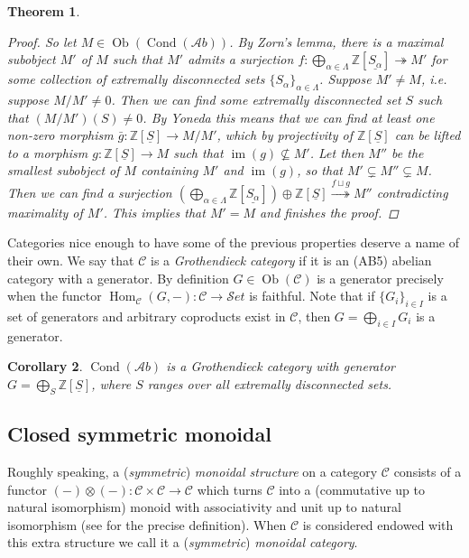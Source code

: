 \documentclass[11pt,A4]{article}
\theoremstyle{plain}
\newtheorem{thm}{Theorem}[section]
\newtheorem{cor}[thm]{Corollary}
\theoremstyle{definition}
\theoremstyle{remark}
\newcommand{\Z}{\mathbb{Z}}
\newcommand{\1}{\mathbbm{1}}
\newcommand{\C}{\mathscr{C}}
\newcommand{\Ab}{\mathscr{A}b}
\newcommand{\Set}{\mathscr{S}et}
\DeclareMathOperator{\Hom}{Hom}
\DeclareMathOperator{\Cond}{Cond}
\DeclareMathOperator{\Ob}{Ob}
\DeclareMathOperator{\im}{im}
\renewcommand{\u}[1]{\underline{#1}}
\newcommand{\ot}{\otimes}
\newcommand{\op}{\oplus}
\begin{document}
\begin{thm}
\begin{proof}
	So let $M\in \Ob(\Cond(\Ab))$.
	By Zorn's lemma, there is a maximal subobject $M'$ of $M$ such that $M'$ admits a surjection $f\colon \bigoplus_{\alpha\in \Lambda}\Z[\u{S_{\alpha}}]\twoheadrightarrow M'$ for some collection of extremally disconnected sets $\{S_{\alpha}\}_{\alpha\in \Lambda}$.
	Suppose $M'\neq M$, i.e. suppose $M/M'\neq 0$.
	Then we can find some extremally disconnected set $S$ such that $(M/M')(S)\neq 0$.
	By Yoneda this means that we can find at least one non-zero morphism $\bar{g}\colon \Z[\u{S}]\to M/M'$, which by projectivity of $\Z[\u{S}]$ can be lifted to a morphism $g\colon \Z[\u{S}]\to M$ such that $\im(g)\not\subseteq M'$.
	Let then $M''$ be the smallest subobject of $M$ containing $M'$ and $\im(g)$, so that $M'\subsetneq M''\subsetneq M$.
	Then we can find a surjection $(\bigoplus_{\alpha\in \Lambda} \Z[\u{S_{\alpha}}])\op \Z[\u{S}]\overset{f\sqcup g}{\twoheadrightarrow} M''$ contradicting maximality of $M'$.
	This implies that $M'=M$ and finishes the proof.
    \end{proof}
\end{thm}

Categories nice enough to have some of the previous properties deserve a name of their own.
We say that $\C$ is a \textit{Grothendieck category} if it is an (AB5) abelian category with a generator.
By definition $G\in \Ob(\C)$ is a generator precisely when the functor $\Hom_{\C}(G,-)\colon \C\to \Set$ is faithful.
Note that if $\{G_{i}\}_{i\in I}$ is a set of generators and arbitrary coproducts exist in $\C$, then $G=\bigoplus_{i\in I}G_{i}$ is a generator.

\begin{cor}
    $\Cond(\Ab)$ is a Grothendieck category with generator $G=\bigoplus_{S}\Z[\u{S}]$, where $S$ ranges over all extremally disconnected sets.
\end{cor}

\subsection{Closed symmetric monoidal}

Roughly speaking, a (\textit{symmetric}) \textit{monoidal structure} on a category $\C$ consists of a functor $(-)\ot(-)\colon \C\times \C\to \C$ which turns $\C$ into a (commutative up to natural isomorphism) monoid with associativity and unit up to natural isomorphism (see \cite{nlab:monoidal_category} for the precise definition).
When $\C$ is considered endowed with this extra structure we call it a (\textit{symmetric}) \textit{monoidal category}.
\end{document}
